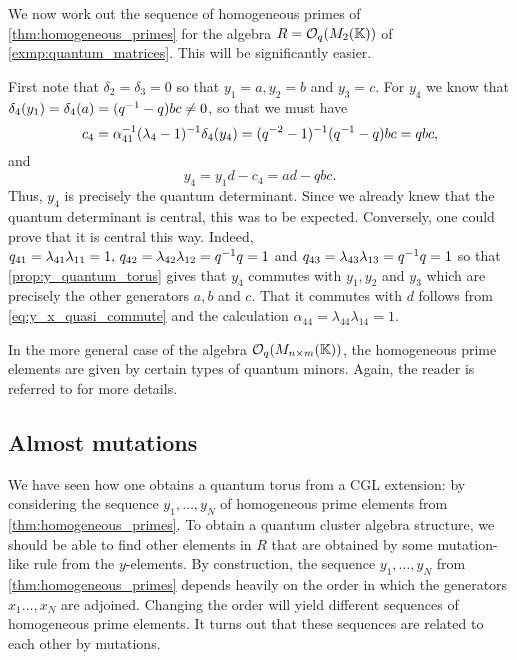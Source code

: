 \begin{example}\label{exmp:quantum_matrices_hom_primes}
	We now work out the sequence of homogeneous primes of \cref{thm:homogeneous_primes} for the algebra $R = \mathcal{O}_q(M_2(\mathbb{K}))$ of \cref{exmp:quantum_matrices}. This will be significantly easier.

	First note that $\delta_2 = \delta_3 = 0$ so that $y_1 = a, y_2 = b$ and $y_3 = c$. For
	$y_4$ we know that $\delta_4(y_1) = \delta_4(a) = (q^{-1} -q)bc \neq 0$, so that we must
	have
	\begin{equation*}
		c_4 = \alpha_{41}^{-1}(\lambda_4 -1)^{-1} \delta_4(y_4) = (q^{-2} - 1)^{-1}(q^{-1} - q)bc = q bc,
	\end{equation*}
	and
	\begin{equation*}
		y_4 = y_1 d - c_4 = a d - q bc.
	\end{equation*}
	Thus, $y_4$ is precisely the quantum determinant. Since we already knew that the
	quantum determinant is central, this was to be expected. Conversely, one could prove
	that it is central this way. Indeed, $q_{41} = \lambda_{41}\lambda_{11} = 1, \, q_{42}
		= \lambda_{42}\lambda_{12} = q^{-1} q = 1$ and $q_{43} = \lambda_{43}\lambda_{13} =
		q^{-1} q = 1$ so that \cref{prop:y_quantum_torus} gives that $y_4$ commutes with
	$y_1,y_2$ and $y_3$ which are precisely the other generators $a,b$ and $c$. That it
	commutes with $d$ follows from \cref{eq:y_x_quasi_commute} and the calculation
	$\alpha_{44} = \lambda_{44}\lambda_{14} = 1$.

	In the more general case of the algebra $\mathcal{O}_q(M_{n \times m}(\mathbb{K}))$, the homogeneous
	prime elements are given by certain types of quantum minors. Again, the reader is
	referred to \cite{GoodearlYakimov2017QCA} for more details.
\end{example}

\subsection{Almost mutations}

We have seen how one obtains a quantum torus from a CGL extension: by considering the
sequence $y_1, \dots, y_N$ of homogeneous prime elements from
\cref{thm:homogeneous_primes}. To obtain a quantum cluster algebra structure, we should
be able to find other elements in $R$ that are obtained by some mutation-like rule from
the $y$-elements. By construction, the sequence $y_1, \dots, y_N$ from
\cref{thm:homogeneous_primes} depends heavily on the order in which the generators $x_1
	\dots, x_N$ are adjoined. Changing the order will yield different sequences of
homogeneous prime elements. It turns out that these sequences are related to each other
by mutations.

